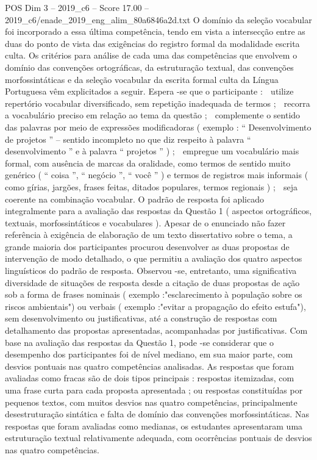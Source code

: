 \begin{textsample}{POS Dim 3 – 2019\_c6 – Score 17.00 – 2019\_c6/enade\_2019\_eng\_alim\_80a6846a2d.txt}
O domínio da seleção vocabular foi incorporado a essa última competência, tendo em vista a intersecção entre as duas do ponto de vista das exigências do registro formal da modalidade escrita culta.
Os critérios para análise de cada uma das competências que envolvem o domínio das convenções ortográficas, da estruturação textual, das convenções morfossintáticas e da seleção vocabular da escrita formal culta da Língua Portuguesa vêm explicitados a seguir.
Espera -se que o participante :  utilize repertório vocabular diversificado, sem repetição inadequada de termos ;  recorra a vocabulário preciso em relação ao tema da questão ;  complemente o sentido das palavras por meio de expressões modificadoras ( exemplo : “ Desenvolvimento de projetos ” – sentido incompleto no que diz respeito à palavra “ desenvolvimento ” e à palavra “ projetos ” ) ;  empregue um vocabulário mais formal, com ausência de marcas da oralidade, como termos de sentido muito genérico ( “ coisa ”, “ negócio ”, “ você ” ) e termos de registros mais informais ( como gírias, jargões, frases feitas, ditados populares, termos regionais ) ;  seja coerente na combinação vocabular.
O padrão de resposta foi aplicado integralmente para a avaliação das respostas da Questão 1 ( aspectos ortográficos, textuais, morfossintáticos e vocabulares ).
Apesar de o enunciado não fazer referência à exigência de elaboração de um texto dissertativo sobre o tema, a grande maioria dos participantes procurou desenvolver as duas propostas de intervenção de modo detalhado, o que permitiu a avaliação dos quatro aspectos linguísticos do padrão de resposta.
Observou -se, entretanto, uma significativa diversidade de situações de resposta desde a citação de duas propostas de ação sob a forma de frases nominais ( exemplo :"esclarecimento à população sobre os riscos ambientais") ou verbais ( exemplo :"evitar a propagação do efeito estufa"), sem desenvolvimento ou justificativas, até a construção de respostas com detalhamento das propostas apresentadas, acompanhadas por justificativas.
Com base na avaliação das respostas da Questão 1, pode -se considerar que o desempenho dos participantes foi de nível mediano, em sua maior parte, com desvios pontuais nas quatro competências analisadas.
As respostas que foram avaliadas como fracas são de dois tipos principais : respostas itemizadas, com uma frase curta para cada proposta apresentada ; ou respostas constituídas por pequenos textos, com muitos desvios nas quatro competências, principalmente desestruturação sintática e falta de domínio das convenções morfossintáticas.
Nas respostas que foram avaliadas como medianas, os estudantes apresentaram uma estruturação textual relativamente adequada, com ocorrências pontuais de desvios nas quatro competências.

\end{textsample}
